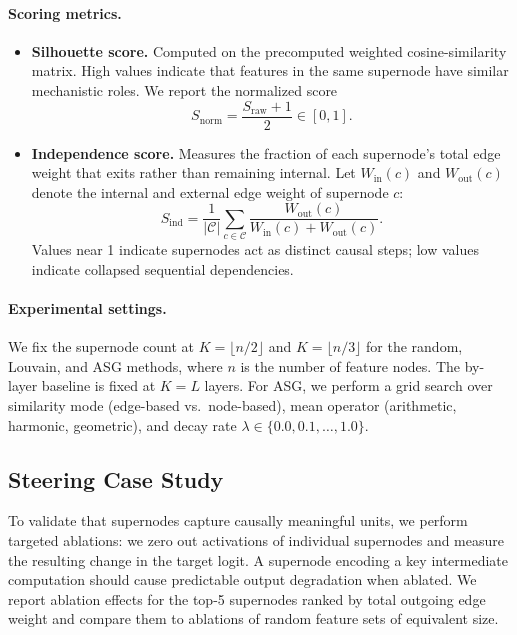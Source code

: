 \documentclass[11pt]{article}
\begin{document}
\paragraph{Scoring metrics.}
\begin{itemize}
  \item \textbf{Silhouette score.} Computed on the precomputed weighted cosine-similarity matrix. High values indicate that features in the same supernode have similar mechanistic roles. We report the normalized score
  \[
    S_{\mathrm{norm}} = \frac{S_{\mathrm{raw}} + 1}{2} \in [0,1].
  \]
  \item \textbf{Independence score.} Measures the fraction of each supernode's total edge weight that exits rather than remaining internal. Let $W_{\mathrm{in}}(c)$ and $W_{\mathrm{out}}(c)$ denote the internal and external edge weight of supernode $c$:
  \[
    S_{\mathrm{ind}} = \frac{1}{|\mathcal{C}|} \sum_{c \in \mathcal{C}} \frac{W_{\mathrm{out}}(c)}{W_{\mathrm{in}}(c) + W_{\mathrm{out}}(c)}.
  \]
  Values near 1 indicate supernodes act as distinct causal steps; low values indicate collapsed sequential dependencies.
\end{itemize}

\paragraph{Experimental settings.}
We fix the supernode count at $K = \lfloor n/2 \rfloor$ and $K = \lfloor n/3 \rfloor$ for the random, Louvain, and ASG methods, where $n$ is the number of feature nodes. The by-layer baseline is fixed at $K = L$ layers. For ASG, we perform a grid search over similarity mode (edge-based vs.\ node-based), mean operator (arithmetic, harmonic, geometric), and decay rate $\lambda \in \{0.0, 0.1, \ldots, 1.0\}$.

\subsection{Steering Case Study}

To validate that supernodes capture causally meaningful units, we perform targeted ablations: we zero out activations of individual supernodes and measure the resulting change in the target logit. A supernode encoding a key intermediate computation should cause predictable output degradation when ablated. We report ablation effects for the top-5 supernodes ranked by total outgoing edge weight and compare them to ablations of random feature sets of equivalent size.
\end{document}
